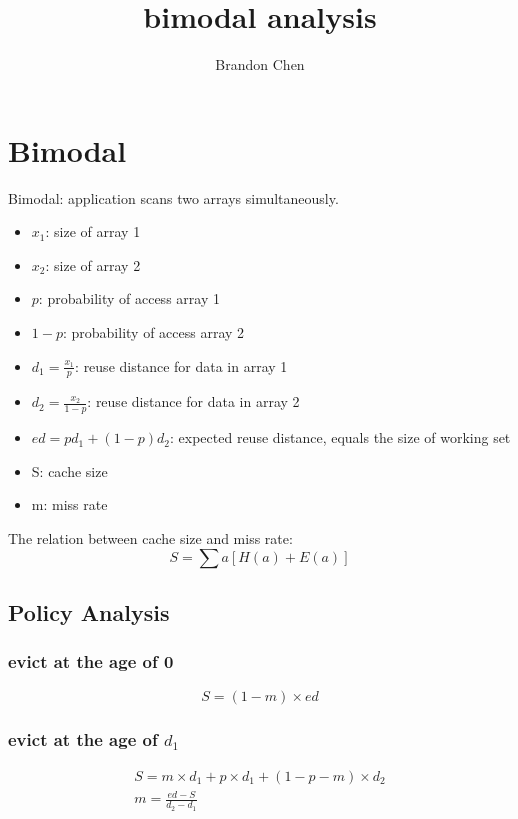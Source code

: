\documentclass[12pt, letterpaper]{article}
\title{bimodal analysis}
\author{Brandon Chen}
\begin{document}
\maketitle

\section{Bimodal}

Bimodal: application scans two arrays simultaneously.

\begin{itemize}
\item $x_1$: size of array 1
\item $x_2$: size of array 2
\item $p$: probability of access array 1
\item $1-p$: probability of access array 2
\item $d_1 = \frac{x_1}{p}$: reuse distance for data in array 1
\item $d_2 = \frac{x_2}{1-p}$: reuse distance for data in array 2
\item $ed = p d_1 + (1-p) d_2$: expected reuse distance, equals the size of
working set 
\item S: cache size
\item m: miss rate
\end{itemize}

The relation between cache size and miss rate:
\begin{equation}
S = \sum a [H(a) + E(a)]
\end{equation}

\subsection{Policy Analysis}

\subsubsection{evict at the age of 0}
\begin{equation}
S = (1-m) \times ed
\end{equation}

\subsubsection{evict at the age of $d_1$}

\begin{equation}
\begin{gathered}
S = m \times d_1 + p \times d_1 + (1-p-m) \times d_2 \\
m = \frac{ed - S}{d_2-d_1}
\end{gathered}
\end{equation}
\end{document}
